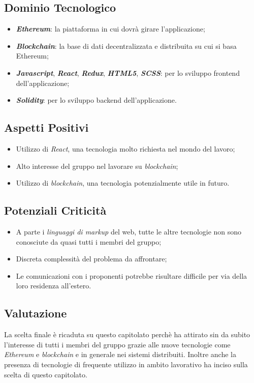 \subsection{Dominio Tecnologico}
\begin{itemize}
	\item \textit{\textbf{Ethereum}}: la piattaforma in cui dovrà girare l'applicazione;
	\item \textit{\textbf{Blockchain}}: la base di dati decentralizzata e distribuita su cui si basa Ethereum;
	\item \textbf{\textit{Javascript}}, \textit{\textbf{React}}, \textit{\textbf{Redux}}, \textbf{\textit{HTML5}}, \textit{\textbf{SCSS}}: 
	per lo sviluppo frontend dell'applicazione;
	\item \textit{\textbf{Solidity}}: per lo sviluppo backend dell'applicazione.
\end{itemize}

\subsection{Aspetti Positivi}
\begin{itemize}
	\item Utilizzo di \textit{React}, una tecnologia molto richiesta nel mondo del lavoro;
	\item Alto interesse del gruppo nel lavorare su \textit{blockchain};
	\item Utilizzo di \textit{blockchain}, una tecnologia potenzialmente utile in futuro.
\end{itemize}

\subsection{Potenziali Criticità}
\begin{itemize}
	\item A parte i \textit{linguaggi di markup} del web, tutte le altre tecnologie non sono conosciute da quasi tutti i membri del gruppo;
	\item Discreta complessità del problema da affrontare;
	\item Le comunicazioni con i proponenti potrebbe risultare difficile per via della loro residenza all'estero.
\end{itemize}

\subsection{Valutazione}
La scelta finale è ricaduta su questo capitolato perchè ha attirato sin da subito l'interesse di tutti i membri del gruppo grazie alle nuove tecnologie come \textit{Ethereum} e \textit{blockchain} e in generale nei sistemi distribuiti.
Inoltre anche la presenza di tecnologie di frequente utilizzo in ambito lavorativo ha inciso sulla scelta di questo capitolato.